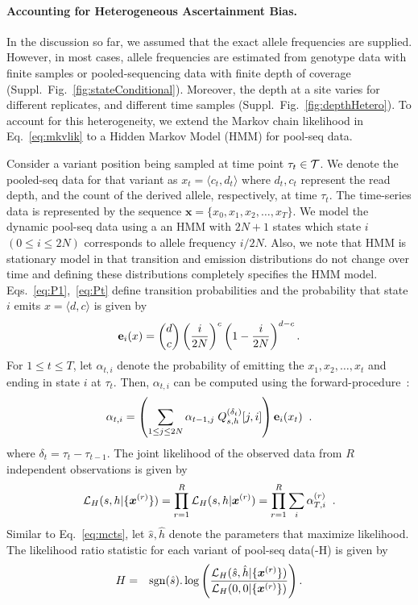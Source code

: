 \paragraph{Accounting for Heterogeneous Ascertainment Bias.}
In the discussion so far, we assumed that the exact allele frequencies
are supplied. However, in most cases, allele frequencies are estimated
from genotype data with finite samples or pooled-sequencing data with
finite depth of coverage (Suppl.~Fig.~\ref{fig:stateConditional}).
Moreover, the depth at a site varies for different replicates, and
different time samples (Suppl.~Fig.~\ref{fig:depthHetero}). To account
for this heterogeneity, we extend the Markov chain likelihood in
Eq.~\ref{eq:mkvlik} to a Hidden Markov Model (HMM) for pool-seq data.

Consider a variant position being sampled at time point $\tau_t\in
{\cal T}$. We denote the pooled-seq data for that variant as $x_t =
\langle c_t,d_t \rangle$ where $d_t, c_t$ represent the read depth,
and the count of the derived allele, respectively, at time
$\tau_t$. The time-series data is represented by the sequence
$\bm{x}=\{x_0,x_1,x_2,\ldots,x_T\}$. We model the dynamic pool-seq data using a 
an HMM with $2N+1$ states which state $i$ $(0\le i\le 2N)$ corresponds to 
allele frequency $i/2N$. 
Also, we note that HMM is stationary model in that transition and emission
distributions do not change over time and defining these distributions 
completely specifies the HMM model. Eqs.~\ref{eq:P1},~\ref{eq:Pt} define 
transition probabilities and the probability that state $i$ emits $
x=\langle d, c\rangle $ is given by
\begin{equation*}
{\bf e}_{i}(x) = {d \choose c} \left(\frac{i}{2N} \right)^c\left (1- 
\frac{i}{2N} \right)^{d-c}.
\end{equation*}
For $1\le t\le T$, let $\alpha_{t,i}$ denote the probability of
emitting the $x_1,x_2,\ldots,x_t$ and ending in state $i$ at
$\tau_t$. Then, $\alpha_{t,i}$ can be computed using the
forward-procedure~\cite{durbin1998biological}:
\begin{equation}
  \alpha_{t,i} = \left( \sum_{1\le j\le 2N} 
  \alpha_{t-1,j}\;Q^{(\delta_t)}_{s,h}[j,i] \right) {\bf e}_{i}(x_t)\;\; .
  \label{eq:hmm}
\end{equation}
where $\delta_t=\tau_t-\tau_{t-1}$. The joint likelihood of the
observed data from $R$ independent observations is given by
\begin{equation}
  {\cal L}_{H}(s,h|\{\bm{x}^{(r)}\})=\prod_{r=1}^R{\cal L}_{H}(s,h|\bm{x}^{(r)}) = 
  \prod_{r=1}^R \sum_i\alpha_{T,i}^{(r)}\;\;.
  \label{eq:hmmlik}
\end{equation}
Similar to Eq.~\ref{eq:mcts}, let $\hat{s},\hat{h}$ denote the parameters that
maximize likelihood. The likelihood ratio statistic for
each variant of pool-seq data(\comale-H) is given by
\begin{eqnarray}
H &=& \operatorname{sgn} (\hat{s}). \log 
\left(\frac{{\cal L}_H(\hat{s},\hat{h}|\{\bm{x}^{(r)}\})}{{\cal L}_H(0,0|\{\bm{x}^{(r)}\})}\right).
\label{eq:hmmml}
\end{eqnarray}

